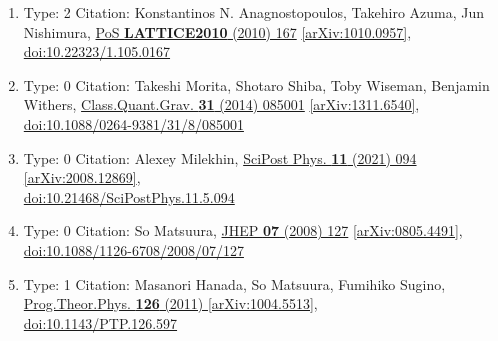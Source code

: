 \documentclass[a4paper,10pt]{article}
\begin{document}
\begin{enumerate}
\begin{enumerate}
  \item Type: 2 Citation: Konstantinos N. Anagnostopoulos, Takehiro Azuma, Jun Nishimura, \href{https://www.doi.org/10.22323/1.105.0167}{PoS {\bf LATTICE2010} (2010) 167}  \href{https://arxiv.org/abs/1010.0957}{[arXiv:1010.0957]},\\\href{https://www.doi.org/10.22323/1.105.0167}{doi:10.22323/1.105.0167}
  \item Type: 0 Citation: Takeshi Morita, Shotaro Shiba, Toby Wiseman, Benjamin Withers, \href{https://www.doi.org/10.1088/0264-9381/31/8/085001}{Class.Quant.Grav. {\bf 31} (2014) 085001}  \href{https://arxiv.org/abs/1311.6540}{[arXiv:1311.6540]},\\\href{https://www.doi.org/10.1088/0264-9381/31/8/085001}{doi:10.1088/0264-9381/31/8/085001}
  \item Type: 0 Citation: Alexey Milekhin, \href{https://www.doi.org/10.21468/SciPostPhys.11.5.094}{SciPost Phys. {\bf 11} (2021) 094}  \href{https://arxiv.org/abs/2008.12869}{[arXiv:2008.12869]},\\\href{https://www.doi.org/10.21468/SciPostPhys.11.5.094}{doi:10.21468/SciPostPhys.11.5.094}
  \item Type: 0 Citation: So Matsuura, \href{https://www.doi.org/10.1088/1126-6708/2008/07/127}{JHEP {\bf 07} (2008) 127}  \href{https://arxiv.org/abs/0805.4491}{[arXiv:0805.4491]},\\\href{https://www.doi.org/10.1088/1126-6708/2008/07/127}{doi:10.1088/1126-6708/2008/07/127}
  \item Type: 1 Citation: Masanori Hanada, So Matsuura, Fumihiko Sugino, \href{https://www.doi.org/10.1143/PTP.126.597}{Prog.Theor.Phys. {\bf 126} (2011) }  \href{https://arxiv.org/abs/1004.5513}{[arXiv:1004.5513]},\\\href{https://www.doi.org/10.1143/PTP.126.597}{doi:10.1143/PTP.126.597}

\end{enumerate}
\end{enumerate}
\end{document}
